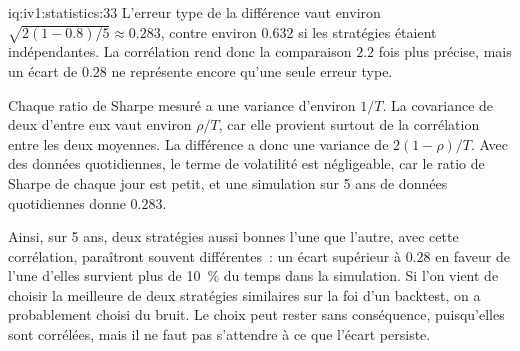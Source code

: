 \begin{solution}{iq:iv1:statistics:33}
L'erreur type de la différence vaut environ $\sqrt{2(1 - 0.8)/5} \approx 0.283$, contre environ $0.632$ si les stratégies étaient indépendantes. La corrélation rend donc la comparaison $2.2$ fois plus précise, mais un écart de $0.28$ ne représente encore qu'une seule erreur type.

Chaque ratio de Sharpe mesuré a une variance d'environ $1/T$. La covariance de deux d'entre eux vaut environ $\rho/T$, car elle provient surtout de la corrélation entre les deux moyennes. La différence a donc une variance de $2(1 - \rho)/T$. Avec des données quotidiennes, le terme de volatilité est négligeable, car le ratio de Sharpe de chaque jour est petit, et une simulation sur 5 ans de données quotidiennes donne $0.283$.

Ainsi, sur 5 ans, deux stratégies aussi bonnes l'une que l'autre, avec cette corrélation, paraîtront souvent différentes~: un écart supérieur à $0.28$ en faveur de l'une d'elles survient plus de 10~\% du temps dans la simulation. Si l'on vient de choisir la meilleure de deux stratégies similaires sur la foi d'un backtest, on a probablement choisi du bruit. Le choix peut rester sans conséquence, puisqu'elles sont corrélées, mais il ne faut pas s'attendre à ce que l'écart persiste.

\end{solution}

